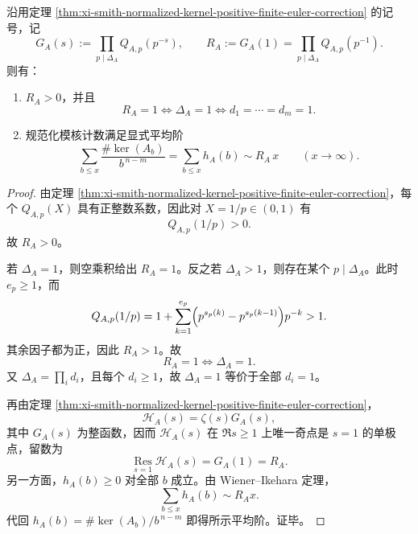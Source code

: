 \begin{corollary}\label{cor:xi-smith-normalized-kernel-average-order}
沿用定理 \ref{thm:xi-smith-normalized-kernel-positive-finite-euler-correction} 的记号，记
\[
G_A(s):=\prod_{p\mid \Delta_A}Q_{A,p}(p^{-s}),
\qquad
R_A:=G_A(1)=\prod_{p\mid \Delta_A}Q_{A,p}(p^{-1}).
\]
则有：
\begin{enumerate}
  \item \(R_A>0\)，并且
  \[
  R_A=1
  \iff
  \Delta_A=1
  \iff
  d_1=\cdots=d_m=1.
  \]
  \item 规范化模核计数满足显式平均阶
  \[
  \boxed{\;
  \sum_{b\le x}\frac{\#\ker(A_b)}{b^{\,n-m}}
  =
  \sum_{b\le x}h_A(b)
  \sim
  R_A\,x
  \qquad (x\to\infty).\;}
  \]
\end{enumerate}
\end{corollary}
\begin{proof}
由定理 \ref{thm:xi-smith-normalized-kernel-positive-finite-euler-correction}，每个 \(Q_{A,p}(X)\) 具有正整数系数，因此对 \(X=1/p\in(0,1)\) 有
\[
Q_{A,p}(1/p)>0.
\]
故 \(R_A>0\)。

若 \(\Delta_A=1\)，则空乘积给出 \(R_A=1\)。反之若 \(\Delta_A>1\)，则存在某个 \(p\mid \Delta_A\)。此时 \(e_p\ge 1\)，而
\[
Q_{A,p}(1/p)
=
1+\sum_{k=1}^{e_p}\Bigl(p^{s_p(k)}-p^{s_p(k-1)}\Bigr)p^{-k}
>1.
\]
其余因子都为正，因此 \(R_A>1\)。故
\[
R_A=1\iff \Delta_A=1.
\]
又 \(\Delta_A=\prod_i d_i\)，且每个 \(d_i\ge 1\)，故 \(\Delta_A=1\) 等价于全部 \(d_i=1\)。

再由定理 \ref{thm:xi-smith-normalized-kernel-positive-finite-euler-correction}，
\[
\mathcal H_A(s)=\zeta(s)G_A(s),
\]
其中 \(G_A(s)\) 为整函数，因而 \(\mathcal H_A(s)\) 在 \(\Re s\ge 1\) 上唯一奇点是 \(s=1\) 的单极点，留数为
\[
\operatorname*{Res}_{s=1}\mathcal H_A(s)=G_A(1)=R_A.
\]
另一方面，\(h_A(b)\ge 0\) 对全部 \(b\) 成立。由 Wiener--Ikehara 定理，
\[
\sum_{b\le x}h_A(b)\sim R_Ax.
\]
代回 \(h_A(b)=\#\ker(A_b)/b^{\,n-m}\) 即得所示平均阶。证毕。
\end{proof}

